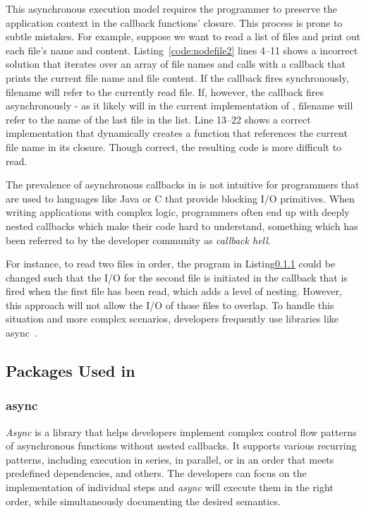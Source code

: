 This asynchronous execution model requires the programmer to preserve the
application context in the callback functions' closure.  This process
is prone to subtle mistakes.  For example, suppose we want to
read a list of files and print out each file's name and content.
Listing~\ref{code:nodefile2}  lines 4--11 shows a incorrect solution that
iterates over an array of file names and calls  with a callback
that prints the current file name and file content. 
If the callback fires synchronously, filename will refer to the currently
read file. If, however, the callback fires asynchronously - as it likely will
in the current implementation of , filename will refer to the
name of the last file in the list.
Line 13--22 shows a correct implementation that dynamically creates a function 
that references the current file name in its closure.
Though correct, the resulting code is more difficult to read.


The prevalence of asynchronous callbacks in \js is not intuitive for
programmers that are used to languages like Java or C that provide blocking I/O 
primitives.
When writing applications with complex logic, programmers often end up with deeply
nested callbacks which make their code hard to understand, something which has
been referred to by the developer community as \emph{callback hell}. 

For instance, to read two files in order, the program in Listing\ref{} could
be changed such that the I/O for the second file is initiated in the callback
that is fired when the first file has been read, which adds a level of nesting.
However, this approach will not allow the I/O of those files to overlap.
To handle this situation and more complex scenarios, developers frequently use 
libraries like async~\cite{async}. %


\subsection{\nodejs Packages Used in \cb}
\label{sec:nodepackage}

\subsubsection{async}
\emph{Async} is a library that helps developers implement complex control 
flow patterns of asynchronous functions without nested callbacks.
It supports various recurring patterns, including
execution in series, in parallel, or in an order that meets predefined dependencies,
and others.
The developers can focus on the implementation of individual steps
and \emph{async} will execute them in the right order, while simultaneously 
documenting the desired semantics.

